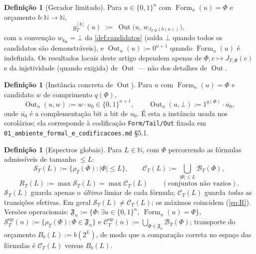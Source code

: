 \documentclass[11pt,a4paper]{article}
\theoremstyle{definition}
\newtheorem{definition}[theorem]{Definição}
\theoremstyle{remark}
\newcommand{\Fm}{\operatorname{Form}}
\newcommand{\Out}{\operatorname{Out}}
\newcommand{\N}{\mathbb{N}}
\begin{document}
\begin{definition}[Gerador limitado]\label{def:gen}
Para $u \in \{0,1\}^n$ com $\Fm_n(u) = \Phi$ e orçamento $b : \N \to \N$,
\begin{equation}\label{eq:gen}
  g_T^{[b]}(u) \;:=\; \Out\bigl(u,\, w_{J_{T,\Phi}(b(n))}\bigr),
\end{equation}
com a convenção $w_{k_\Phi} = \bot$ da \cref{def:candidatos}
(sa\'{i}da $\bot$ quando todos os candidatos s\~{a}o demonstr\'{a}veis),
e $\Out_n(u) := 0^{n+1}$ quando $\Fm_n(u)$ \'{e} indefinida. Os resultados
locais deste artigo dependem apenas de $\Phi, c \mapsto J_{T,\Phi}(c)$ e da
injetividade (quando exigida) de $\Out$ — não dos detalhes de $\Out$.
\end{definition}

\begin{definition}[Instância concreta de $\Out$]\label{def:out}
Para $u$ com $\Fm_n(u) = \Phi$ e candidato $w$ de comprimento $q(\Phi)$,
\begin{equation}\label{eq:out}
  \Out_n(u,w) := w \cdot u_0 \in \{0,1\}^{n+1},
  \qquad
  \Out_n(u,\bot) := 1^{q(\Phi)} \cdot \overline{u_0},
\end{equation}
onde $\overline{u_0}$ é a complementação bit a bit de $u_0$. É esta a
instância usada nos corolários; ela corresponde à codificação
\texttt{Form/Tail/Out} fixada em \texttt{01\_ambiente\_formal\_e\_codificacoes.md} §5.1.
\end{definition}

\begin{definition}[Espectros globais]\label{def:espectros}
Para $L \in \N$, com $\Phi$ percorrendo as fórmulas admissíveis de tamanho
$\leq L$:
\begin{equation}\label{eq:SC}
  \mathcal{S}_T(L) := \{\rho_T(\Phi) : |\Phi| \leq L\},
  \qquad
  \mathcal{C}_T(L) := \bigcup_{|\Phi| \leq L} \mathcal{B}_T(\Phi),
\end{equation}
\begin{equation}\label{eq:R}
  R_T(L) := \max \mathcal{S}_T(L) = \max \mathcal{C}_T(L)
  \qquad (\text{conjuntos não vazios}).
\end{equation}
$\mathcal{S}_T(L)$ guarda apenas o \emph{último} limiar de cada fórmula;
$\mathcal{C}_T(L)$ guarda \emph{todas} as transições efetivas.
Em geral $\mathcal{S}_T(L) \neq \mathcal{C}_T(L)$; os máximos coincidem
(\cref{eq:R}). Versões operacionais: $\mathfrak{F}_n := \{\Phi : \exists u \in
\{0,1\}^n,\ \Fm_n(u) = \Phi\}$, $\mathcal{S}^{\mathrm{op}}_T(n) :=
\{\rho_T(\Phi) : \Phi \in \mathfrak{F}_n\}$ e
$\mathcal{C}^{\mathrm{op}}_T(n) := \bigcup_{\Phi \in \mathfrak{F}_n}
\mathcal{B}_T(\Phi)$; transporte do orçamento $B_b(L) := b(2^L)$, de modo que a
comparação correta no espaço das fórmulas é $\mathcal{C}_T(L)$ versus $B_b(L)$.
\end{definition}
\end{document}
